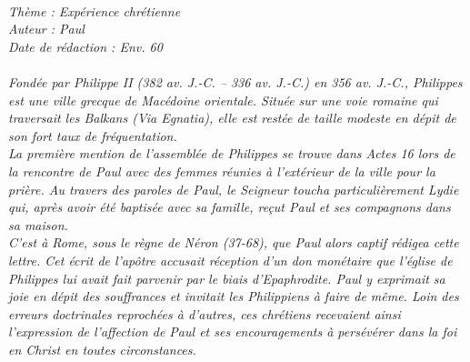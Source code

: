 \BFont
\noindent\hrulefill
{\footnotesize
\textit{
\bigskip
{\centering{}
\\Thème : Expérience chrétienne
\\Auteur : Paul
\\Date de rédaction : Env. 60\\}
}
\textit{
\\Fondée par Philippe II (382 av. J.-C. – 336 av. J.-C.) en 356 av. J.-C., Philippes est une ville grecque de Macédoine orientale. Située sur une voie romaine qui traversait les Balkans (Via Egnatia), elle est restée de taille modeste en dépit de son fort taux de fréquentation.
\\La première mention de l’assemblée de Philippes se trouve dans Actes 16 lors de la rencontre de Paul avec  des femmes réunies à l’extérieur  de la ville pour la prière. Au travers des paroles de Paul, le Seigneur toucha particulièrement Lydie qui, après avoir été baptisée avec sa famille,  reçut Paul et ses compagnons dans sa maison.
\\C’est à Rome, sous le règne de Néron (37-68), que Paul alors captif rédigea cette lettre. Cet écrit de l’apôtre accusait réception d’un don monétaire que l’église de Philippes lui avait fait parvenir par le biais d’Epaphrodite. Paul y exprimait sa joie en dépit des souffrances et invitait les Philippiens à faire de même. Loin des erreurs doctrinales reprochées à d’autres, ces chrétiens recevaient ainsi l’expression de l’affection de Paul et ses encouragements à persévérer dans la foi en Christ en toutes circonstances.\bigskip
}
}
\par\nobreak\noindent\hrulefill
